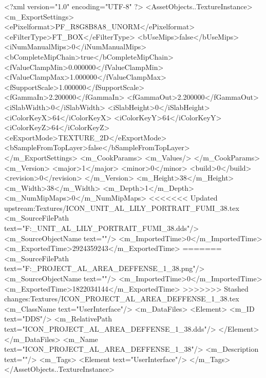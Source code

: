 <?xml version="1.0" encoding="UTF-8" ?>
<AssetObjects..TextureInstance>
	<m_ExportSettings>
		<ePixelformat>PF_R8G8B8A8_UNORM</ePixelformat>
		<eFilterType>FT_BOX</eFilterType>
		<bUseMips>false</bUseMips>
		<iNumManualMips>0</iNumManualMips>
		<bCompleteMipChain>true</bCompleteMipChain>
		<fValueClampMin>0.000000</fValueClampMin>
		<fValueClampMax>1.000000</fValueClampMax>
		<fSupportScale>1.000000</fSupportScale>
		<fGammaIn>2.200000</fGammaIn>
		<fGammaOut>2.200000</fGammaOut>
		<iSlabWidth>0</iSlabWidth>
		<iSlabHeight>0</iSlabHeight>
		<iColorKeyX>64</iColorKeyX>
		<iColorKeyY>64</iColorKeyY>
		<iColorKeyZ>64</iColorKeyZ>
		<eExportMode>TEXTURE_2D</eExportMode>
		<bSampleFromTopLayer>false</bSampleFromTopLayer>
	</m_ExportSettings>
	<m_CookParams>
		<m_Values/>
	</m_CookParams>
	<m_Version>
		<major>1</major>
		<minor>0</minor>
		<build>0</build>
		<revision>0</revision>
	</m_Version>
	<m_Height>38</m_Height>
	<m_Width>38</m_Width>
	<m_Depth>1</m_Depth>
	<m_NumMipMaps>0</m_NumMipMaps>
<<<<<<< Updated upstream:Textures/ICON_UNIT_AL_LILY_PORTRAIT_FUMI_38.tex
	<m_SourceFilePath text="F:\DT\lilyimages\gpportrait\ICON_UNIT_AL_LILY_PORTRAIT_FUMI_38.dds"/>
	<m_SourceObjectName text=""/>
	<m_ImportedTime>0</m_ImportedTime>
	<m_ExportedTime>2924359243</m_ExportedTime>
=======
	<m_SourceFilePath text="F:\DT\lilyimages\all\ICON_PROJECT_AL_AREA_DEFFENSE_1_38.png"/>
	<m_SourceObjectName text=""/>
	<m_ImportedTime>0</m_ImportedTime>
	<m_ExportedTime>1822034144</m_ExportedTime>
>>>>>>> Stashed changes:Textures/ICON_PROJECT_AL_AREA_DEFFENSE_1_38.tex
	<m_ClassName text="UserInterface"/>
	<m_DataFiles>
		<Element>
			<m_ID text="DDS"/>
			<m_RelativePath text="ICON_PROJECT_AL_AREA_DEFFENSE_1_38.dds"/>
		</Element>
	</m_DataFiles>
	<m_Name text="ICON_PROJECT_AL_AREA_DEFFENSE_1_38"/>
	<m_Description text=""/>
	<m_Tags>
		<Element text="UserInterface"/>
	</m_Tags>
</AssetObjects..TextureInstance>

